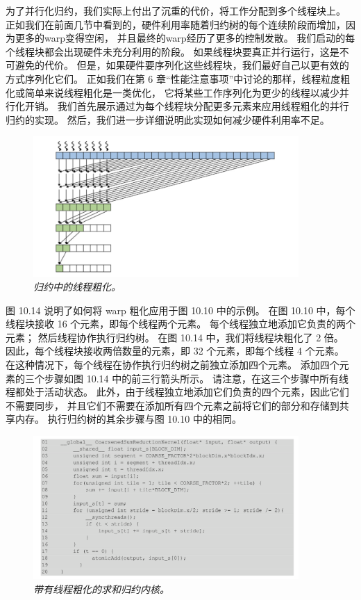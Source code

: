为了并行化归约，我们实际上付出了沉重的代价，将工作分配到多个线程块上。 
正如我们在前面几节中看到的，硬件利用率随着归约树的每个连续阶段而增加，因为更多的warp变得空闲，
并且最终的warp经历了更多的控制发散。 我们启动的每个线程块都会出现硬件未充分利用的阶段。 
如果线程块要真正并行运行，这是不可避免的代价。 但是，如果硬件要序列化这些线程块，我们最好自己以更有效的方式序列化它们。 
正如我们在第 6 章“性能注意事项”中讨论的那样，线程粒度粗化或简单来说线程粗化是一类优化，
它将某些工作序列化为更少的线程以减少并行化开销。 我们首先展示通过为每个线程块分配更多元素来应用线程粗化的并行归约的实现。 
然后，我们进一步详细说明此实现如何减少硬件利用率不足。

\begin{figure}[H]
	\centering
	\includegraphics[width=0.9\textwidth]{figs/F10.14.png}
	\caption{\textit{归约中的线程粗化。}}
\end{figure}

图 10.14 说明了如何将 warp 粗化应用于图 10.10 中的示例。 在图 10.10 中，每个线程块接收 16 个元素，即每个线程两个元素。 
每个线程独立地添加它负责的两个元素； 然后线程协作执行归约树。 在图 10.14 中，我们将线程块粗化了 2 倍。
因此，每个线程块接收两倍数量的元素，即 32 个元素，即每个线程 4 个元素。 
在这种情况下，每个线程在协作执行归约树之前独立添加四个元素。 添加四个元素的三个步骤如图 10.14 中的前三行箭头所示。 
请注意，在这三个步骤中所有线程都处于活动状态。 
此外，由于线程独立地添加它们负责的四个元素，因此它们不需要同步，
并且它们不需要在添加所有四个元素之前将它们的部分和存储到共享内存。 执行归约树的其余步骤与图 10.10 中的相同。

\begin{figure}[H]
	\centering
	\includegraphics[width=0.9\textwidth]{figs/F10.15.png}
	\caption{\textit{带有线程粗化的求和归约内核。}}
\end{figure}

